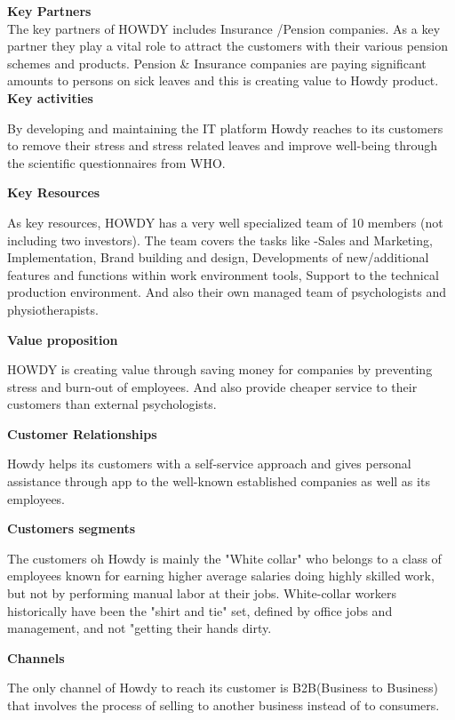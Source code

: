 \noindent \textbf{Key Partners}\\
\noindent The key partners of HOWDY includes Insurance /Pension companies. As a key partner they play a vital role to attract the customers with their various pension schemes and products. Pension \& Insurance companies are paying significant amounts to persons on sick leaves and this is creating value to Howdy product.\\
\noindent \textbf{Key activities}

\noindent By developing and maintaining the IT platform Howdy reaches to its customers to remove their stress and stress related leaves and improve well-being through the scientific questionnaires from WHO.

\noindent \textbf{Key Resources}

\noindent As key resources, HOWDY has a very well specialized team of 10 members (not including two investors). The team covers the tasks like -Sales and Marketing, Implementation, Brand building and design, Developments of new/additional features and functions within work environment tools, Support to the technical production environment. And also their own managed team of psychologists and physiotherapists.

\noindent \textbf{Value proposition}

\noindent HOWDY is creating value through saving money for companies by preventing stress and burn-out of employees. And also provide cheaper service to their customers than external psychologists.

\noindent \textbf{Customer Relationships}

\noindent Howdy helps its customers with a self-service approach and gives personal assistance through app to the well-known established companies as well as its employees.

\noindent \textbf{Customers segments}

\noindent The customers oh Howdy is mainly the "White collar" who belongs to a class of employees known for earning higher average salaries doing highly skilled work, but not by performing manual labor at their jobs. White-collar workers historically have been the "shirt and tie" set, defined by office jobs and management, and not "getting their hands dirty.

\noindent \textbf{Channels}

\noindent The only channel of Howdy to reach its customer is B2B(Business to Business) that involves the process of selling to another business instead of to consumers.

